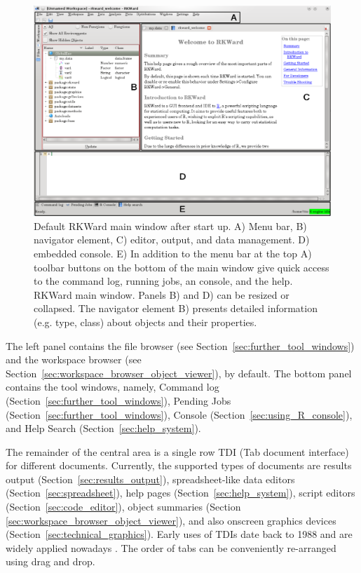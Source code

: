 \begin{figure}[htp]
 \centering
 \includegraphics[width=15.5cm]{../figures/main_window.png}
 \caption{Default RKWard main window after start up. 
A) Menu bar, B) navigator element, C) editor, output, 
and data management. D) embedded  console. 
E) In addition to the menu bar at the top A) toolbar buttons 
on the bottom of the main window give quick access to the command log, 
running jobs, an  console, and the  help. 
RKWard main window. Panels B) and D) can be resized or collapsed. The navigator element B)
presents detailed information (e.g. type, class) about objects and their properties.}
 \label{fig:main_window}
\end{figure}

The left panel contains the file browser (see Section~\ref{sec:further_tool_windows}) and the
workspace browser (see Section~\ref{sec:workspace_browser_object_viewer}), by default. The
bottom panel contains the tool windows, namely, Command
log (Section~\ref{sec:further_tool_windows}), Pending Jobs (Section~\ref{sec:further_tool_windows}),  Console
(Section~\ref{sec:using_R_console}), and Help Search (Section~\ref{sec:help_system}).

The remainder of the central area is a single row TDI (Tab document
interface) for different documents. Currently, the supported types of
documents are results output (Section~\ref{sec:results_output}), spreadsheet-like data editors
(Section~\ref{sec:spreadsheet}), help pages (Section~\ref{sec:help_system}), script editors (Section~\ref{sec:code_editor}),
object summaries (Section \ref{sec:workspace_browser_object_viewer}), and also
 onscreen graphics devices (Section~\ref{sec:technical_graphics}). Early uses of TDIs date back to 1988 and are
widely applied nowadays \citep{Hopkins2005, MDN2010,
KimLutteroth2010}. The order of tabs can be conveniently re-arranged
using drag and drop.


